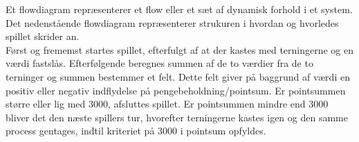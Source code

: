 \noindent Et flowdiagram repræsenterer et flow eller et sæt af dynamisk forhold i et system.
Det nedenstående flowdiagram repræsenterer strukuren i hvordan og hvorledes spillet skrider an.\\

\noindent Først og frememst startes spillet, efterfulgt af at der kastes med terningerne og en værdi fastslås.
Efterfølgende beregnes summen af de to værdier fra de to terninger og summen bestemmer et felt.
Dette felt giver på baggrund af værdi en positiv eller negativ indflydelse på pengebeholdning/pointsum.
Er pointsummen større eller lig med 3000, afsluttes spillet.
Er pointsummen mindre end 3000 bliver det den næste spillers tur, hvorefter terningerne kastes igen og den samme process gentages, indtil kriteriet på 3000 i pointsum opfyldes.\\

